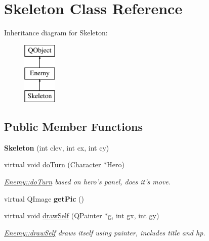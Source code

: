 \hypertarget{class_skeleton}{\section{Skeleton Class Reference}
\label{class_skeleton}
}
Inheritance diagram for Skeleton\-:\begin{figure}[H]
\begin{center}
\leavevmode
\includegraphics[height=3.000000cm]{class_skeleton}
\end{center}
\end{figure}
\subsection*{Public Member Functions}
\begin{DoxyCompactItemize}
\item 
\hypertarget{class_skeleton_ac4920b7ab446add4c8da5c8fe6aff2d3}{{\bfseries Skeleton} (int clev, int cx, int cy)}\label{class_skeleton_ac4920b7ab446add4c8da5c8fe6aff2d3}

\item 
virtual void \hyperlink{class_skeleton_aeb5642a3aa8c49cb0cd1cc325f8f0baa}{do\-Turn} (\hyperlink{class_character}{Character} $\ast$Hero)
\begin{DoxyCompactList}\small\item\em \hyperlink{class_enemy_a56e4b9b07e8cd2a4e5ecfa8ff5b9265a}{Enemy\-::do\-Turn} based on hero's panel, does it's move. \end{DoxyCompactList}\item 
\hypertarget{class_skeleton_a35acfe2e2da4279a56d91bb8f2048489}{virtual Q\-Image {\bfseries get\-Pic} ()}\label{class_skeleton_a35acfe2e2da4279a56d91bb8f2048489}

\item 
virtual void \hyperlink{class_skeleton_ae605f24f6e921ad3b36a53f391304722}{draw\-Self} (Q\-Painter $\ast$g, int gx, int gy)
\begin{DoxyCompactList}\small\item\em \hyperlink{class_enemy_a3251244e8e7ac657687d6be5a8da71bb}{Enemy\-::draw\-Self} draws itself using painter, includes title and hp. \end{DoxyCompactList}\end{DoxyCompactItemize}
